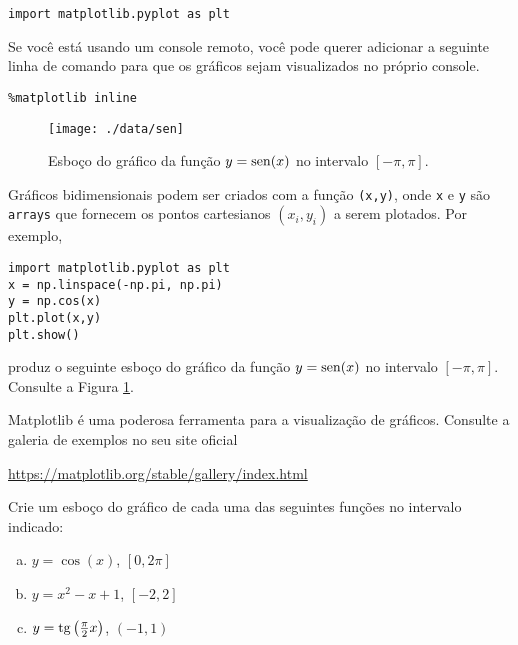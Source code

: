 \documentclass[a4paper,10pt,twoside]{article}
\begin{document}
\begin{lstlisting}
import matplotlib.pyplot as plt
\end{lstlisting}

\begin{obs}
  Se você está usando um console {\python} remoto, você pode querer adicionar a seguinte linha de comando para que os gráficos sejam visualizados no próprio console.

\begin{lstlisting}
%matplotlib inline
\end{lstlisting}

\end{obs}

\begin{figure}[h]
  \centering
  \texttt{[image: ./data/sen]}
  \caption{Esboço do gráfico da função $y=\operatorname{sen}(x)$ no intervalo $[-\pi,\pi]$.}
  \label{fig:sen}
\end{figure}

Gráficos bidimensionais podem ser criados com a função {\PYTHONmatplotlibDOTpyplotDOTplot}\texttt{(x,y)}, onde \texttt{x} e \texttt{y} são \texttt{arrays} que fornecem os pontos cartesianos $(x_i, y_i)$ a serem plotados. Por exemplo,

\begin{lstlisting}
import matplotlib.pyplot as plt
x = np.linspace(-np.pi, np.pi)
y = np.cos(x)
plt.plot(x,y)
plt.show()
\end{lstlisting}

produz o seguinte esboço do gráfico da função $y=\operatorname{sen}(x)$ no intervalo $[-\pi,\pi]$. Consulte a Figura \ref{fig:sen}.


\begin{obs}
  Matplotlib é uma poderosa ferramenta para a visualização de gráficos. Consulte a galeria de exemplos no seu site oficial
  \begin{center}
    \url{https://matplotlib.org/stable/gallery/index.html}
  \end{center}
\end{obs}

\begin{exr}
  Crie um esboço do gráfico de cada uma das seguintes funções no intervalo indicado:
  \begin{enumerate}[a)]
  \item $y = \cos(x)$, $\left[0, 2\pi\right]$
  \item $y = x^2 - x + 1$, $[-2, 2]$
  \item $y = \operatorname{tg}\left(\frac{\pi}{2}x\right)$, $(-1, 1)$
  \end{enumerate}
\end{exr}
\end{document}
